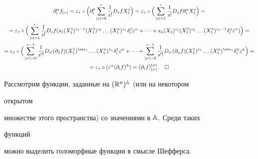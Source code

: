 \begin{multline*} 


\partial^\alpha_i f_{(\tau)}=\varepsilon_\tau\circ\Big( 


\partial^0_i\sum^r_{|s|=0}\frac{1}{s!}D_s f X^s_1\Big)= 


\varepsilon_\tau\circ\Big(\sum^r_{|s|=1}\frac{1}{s!}D_s f 


\partial^\alpha_i X^s_1\Big)= \\ 


% 


=\varepsilon_\tau\circ\Big(\sum^r_{|s|=1}\frac{1}{s!}D_s f 


(s_1(X^1_1)^{s_1-1}(X^2_1)^{s_2}\dotsc(X^n_1)^{s_n} 


\delta^1_i\varepsilon^\alpha+\dotsb+s_n 


(X_1)^{s_1}(X^2_1)^{s_2}\dotsc(X^n_1)^{s_n-1} 


\delta^n_i\varepsilon^\alpha)\Big) =\\ 


% 


=\varepsilon_\tau\circ\Big(\sum^{r-1}_{|s'|=0}\frac{1}{s'!} 


D_{s'}(\partial_1f)(X^1_1)^{\ov s_1}\dotsc 


(X^n_1)^{s_n}\delta^1_i\varepsilon^\alpha+\dotsb+ 


\sum^{r-1}_{|s'|=0}\frac{1}{s'!}D_{s'}(\partial_n f) 


(X^1_1)^{s_1}\dotsc(X^n_1)^{\ov s_n} 


\delta^n_i\varepsilon^\alpha\Big)= \\ 


% 


=\varepsilon_\tau\circ(\varepsilon^\alpha(\partial_i f)\A)= 


(\partial_i f)^{(\alpha)}_{(\tau)}.\quad\square 


\end{multline*} 


 


Рассмотрим функции, заданные на $(\Bbb R^n)^{\Bbb A}$ (или на некотором 


открытом  


множестве этого пространства) со значениями в $\Bbb A$. Среди таких 


функций 


можно выделить голоморфные функции в смысле Шефферса. 


 


